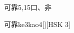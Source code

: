 \begin{entry}{可靠}{5,15}{⼝、⾮}
  \begin{phonetics}{可靠}{ke3kao4}[][HSK 3]
  \end{phonetics}
\end{entry}
